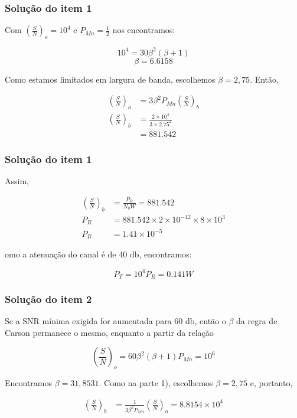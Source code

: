 \documentclass{beamer}
\begin{document}
\begin{frame}
  \frametitle{Solução do item 1}

  Com $ \left(\frac{S}{N}\right)_o = 10^4$ e $P_{Mn} = \frac{1}{2}$ nos encontramos: 

$$10^4 = 30 \beta^2(\beta+1)$$
$$\beta = 6.6158$$

Como estamos limitados em largura de banda, escolhemos $\beta = 2,75$. Então,

\begin{align*}
\left(\frac{S}{N}\right)_o &= 3\beta^2P_{Mn}\left(\frac{S}{N}\right)_b\\
\left(\frac{S}{N}\right)_b &= \frac{2 \times 10^4}{3 \times 2.75^2} \\
&= 881.542
\end{align*}


\end{frame}


\begin{frame}
  \frametitle{Solução do item 1}

  Assim, 

\begin{align*}
\left(\frac{S}{N}\right)_b &= \frac{P_R}{N_0W} = 881.542\\
P_R &= 881.542 \times 2 \times 10^{-12} \times 8 \times 10^3 \\
P_R &= 1.41 \times 10^{-5}
\end{align*}

omo a atenuação do canal é de 40 db, encontramos: 

$$P_T = 10^4P_R = 0.141 W$$


\end{frame}

\begin{frame}
  \frametitle{Solução do item 2}

  Se a SNR mínima exigida for aumentada para 60 db, então o $\beta$ da regra de Carson permanece o
mesmo, enquanto a partir da relação

$$\left(\frac{S}{N}\right)_o = 60 \beta^2(\beta+1)P_{Mn}= 10^6$$

Encontramos $\beta = 31,8531$. Como na parte 1), escolhemos $\beta = 2,75$ e, portanto,

\begin{align*}
\left(\frac{S}{N}\right)_b &= \frac{1}{3\beta^2P_{Mn}}\left(\frac{S}{N}\right)_o = 8.8154 \times 10^4
\end{align*}

\end{frame}
\end{document}
